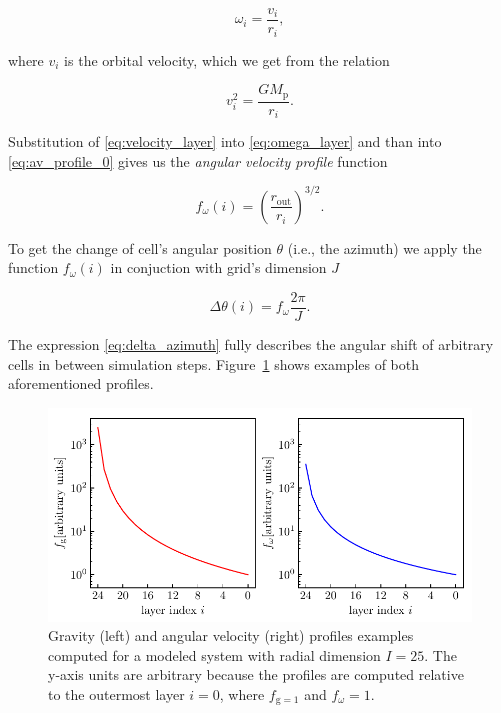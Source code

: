     \begin{equation}
        \omega_i = \frac{v_i}{r_i},
        \label{eq:omega_layer}
    \end{equation}

    where $v_i$ is the orbital velocity, which we get from the relation

    \begin{equation}
        v_i^2 = \frac{G M_{\mathrm{p}}}{r_i}.
        \label{eq:velocity_layer}
    \end{equation}

    Substitution of \eqref{eq:velocity_layer} into \eqref{eq:omega_layer} and than into \eqref{eq:av_profile_0} gives us the \emph{angular velocity profile} function

    \begin{equation}
        f_{\omega}(i) = \left(\frac{r_{\mathrm{out}}}{r_i}\right)^{3/2}.
    \end{equation}

    To get the change of cell's angular position $\theta$ (i.e., the azimuth) we apply the function $f_{\omega}(i)$ in conjuction with grid's dimension $J$

    \begin{equation}
        \Delta \theta (i) = f_{\omega} \frac{2 \pi}{J}.
        \label{eq:delta_azimuth} 
    \end{equation}

    The expression \eqref{eq:delta_azimuth} fully describes the angular shift of arbitrary cells in between simulation steps. Figure~\ref{fig:plot_omega_g_profiles} shows examples of both aforementioned profiles.
    
    \begin{figure}[H]
    \centering
    \includegraphics[width=\columnwidth]{img/plot_omega_g_profiles.pdf}
        \caption{Gravity (left) and angular velocity (right) profiles examples computed for a modeled system with radial dimension $I = 25$. The y-axis units are arbitrary because the profiles are computed relative to the outermost layer $i = 0$, where $f_{\mathrm{g} = 1}$ and $f_{\omega} = 1$.}
    \label{fig:plot_omega_g_profiles}
    \end{figure}
        
